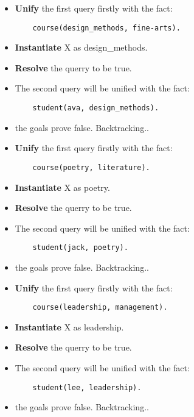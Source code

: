 \begin{itemize}
    \item \textbf{Unify} the first query firstly with the fact:
    \begin{lstlisting}
    course(design_methods, fine-arts).
    \end{lstlisting}
    \item \textbf{Instantiate} X as design\_methods.
    \item \textbf{Resolve} the querry to be true.
    \item The second query will be unified with the fact:
    \begin{lstlisting}
    student(ava, design_methods).
    \end{lstlisting}
    \item the goals prove false. Backtracking..
\end{itemize}

\begin{itemize}
    \item \textbf{Unify} the first query firstly with the fact:
    \begin{lstlisting}
    course(poetry, literature).
    \end{lstlisting}
    \item \textbf{Instantiate} X as poetry.
    \item \textbf{Resolve} the querry to be true.
    \item The second query will be unified with the fact:
    \begin{lstlisting}
    student(jack, poetry).
    \end{lstlisting}
    \item the goals prove false. Backtracking..
\end{itemize}

\begin{itemize}
    \item \textbf{Unify} the first query firstly with the fact:
    \begin{lstlisting}
    course(leadership, management).
    \end{lstlisting}
    \item \textbf{Instantiate} X as leadership.
    \item \textbf{Resolve} the querry to be true.
    \item The second query will be unified with the fact:
    \begin{lstlisting}
    student(lee, leadership).
    \end{lstlisting}
    \item the goals prove false. Backtracking..
\end{itemize}


